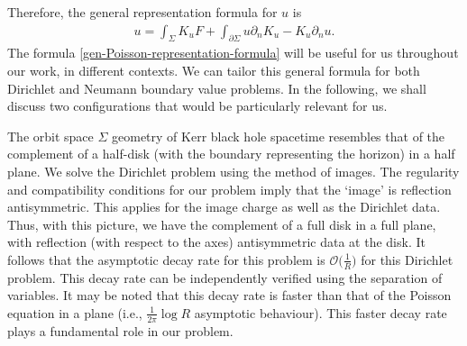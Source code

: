 \documentclass[11pt]{article}
\numberwithin{equation}{section}
\def\ptl{\partial}%
\numberwithin{equation}{section}
\begin{document}
Therefore, the general representation formula for $u$ is
\begin{align} \label{gen-Poisson-representation-formula}
u = \int_{\Sigma} K_u F + \int_{\ptl \Sigma} u \ptl_n K_{u} - K_{u} \ptl_n u.
\end{align}
The formula \eqref{gen-Poisson-representation-formula} will be useful for us throughout our work, in different contexts. We can tailor this general formula for both Dirichlet and Neumann boundary value problems. In the following, we shall discuss two configurations that would be particularly relevant for us.

The orbit space $\Sigma$ geometry of Kerr black hole spacetime resembles that of the complement of a half-disk (with the boundary representing the horizon) in a half plane. We solve the Dirichlet problem using the method of images. The regularity and compatibility conditions for our problem imply that the `image' is reflection antisymmetric. This applies for the image charge as well as the Dirichlet data. Thus, with this picture, we have the complement of a full disk in a full plane, with reflection (with respect to the axes) antisymmetric data at the disk. It follows that the asymptotic decay rate for this problem is $\mathcal{O} \bigl(\frac{1}{R}\bigr)$ for this Dirichlet problem. This decay rate can be independently verified using the separation of variables. It may be noted that this decay rate is faster than that of the Poisson equation in a plane \big(i.e., $\frac{1}{2 \pi} \log R$ asymptotic behaviour\big). This faster decay rate plays a fundamental role in our problem.
\end{document}
